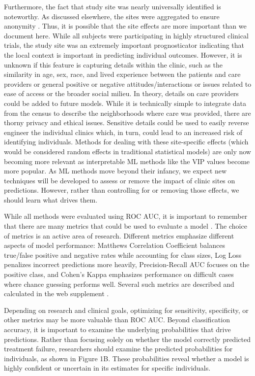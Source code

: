 \documentclass[
  number,
  preprint,
  3p,
  onecolumn]{elsarticle}
\begin{document}
Furthermore, the fact that study site was nearly universally identified
is noteworthy. As discussed elsewhere, the sites were aggregated to
ensure anonymity \citep{raymondbalise2024}. Thus, it is possible that
the site effects are more important than we document here. While all
subjects were participating in highly structured clinical trials, the
study site was an extremely important prognosticator indicating that the
local context is important in predicting individual outcomes. However,
it is unknown if this feature is capturing details within the clinic,
such as the similarity in age, sex, race, and lived experience between
the patients and care providers or general positive or negative
attitudes/interactions or issues related to ease of access or the
broader social milieu. In theory, details on care providers could be
added to future models. While it is technically simple to integrate data
from the census to describe the neighborhoods where care was provided,
there are thorny privacy and ethical issues. Sensitive details could be
used to easily reverse engineer the individual clinics which, in turn,
could lead to an increased risk of identifying individuals. Methods for
dealing with these site-specific effects (which would be considered
random effects in traditional statistical models) are only now becoming
more relevant as interpretable ML methods like the VIP values become
more popular. As ML methods move beyond their infancy, we expect new
techniques will be developed to assess or remove the impact of clinic
sites on predictions. However, rather than controlling for or removing
those effects, we should learn what drives them.

While all methods were evaluated using ROC AUC, it is important to
remember that there are many metrics that could be used to evaluate a
model \citep{sokolova2009, opitz2024}. The choice of metrics is an
active area of research. Different metrics emphasize different aspects
of model performance: Matthews Correlation Coefficient balances
true/false positive and negative rates while accounting for class sizes,
Log Loss penalizes incorrect predictions more heavily, Precision-Recall
AUC focuses on the positive class, and Cohen's Kappa emphasizes
performance on difficult cases where chance guessing performs well.
Several such metrics are described and calculated in the web supplement
\citep{balise_supplement_2025}.

Depending on research and clinical goals, optimizing for sensitivity,
specificity, or other metrics may be more valuable than ROC AUC. Beyond
classification accuracy, it is important to examine the underlying
probabilities that drive predictions. Rather than focusing solely on
whether the model correctly predicted treatment failure, researchers
should examine the predicted probabilities for individuals, as shown in
Figure 1B. These probabilities reveal whether a model is highly
confident or uncertain in its estimates for specific individuals.
\end{document}
